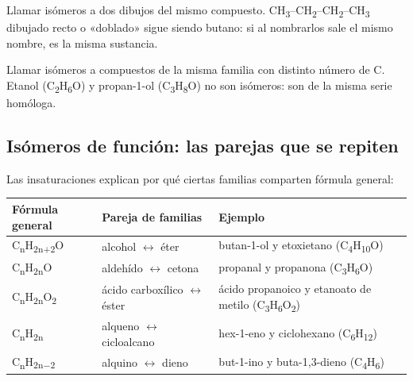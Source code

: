 \begin{ojo} Llamar isómeros a dos dibujos del mismo compuesto. CH\textsubscript{3}--CH\textsubscript{2}--CH\textsubscript{2}--CH\textsubscript{3} dibujado recto o «doblado» sigue siendo butano: si al nombrarlos sale el mismo nombre, es la misma sustancia.\end{ojo}
 
\begin{ojo} Llamar isómeros a compuestos de la misma familia con distinto número de C. Etanol (C\textsubscript{2}H\textsubscript{6}O) y propan-1-ol (C\textsubscript{3}H\textsubscript{8}O) no son isómeros: son de la misma serie homóloga.\end{ojo}
\subsection{Isómeros de función: las parejas que se repiten}
Las insaturaciones explican por qué ciertas familias comparten fórmula general:

 
\begin{center}\small
\begin{tabularx}{\linewidth}{@{}>{\raggedright\arraybackslash\hsize=0.56\hsize}X>{\raggedright\arraybackslash\hsize=0.94\hsize}X>{\raggedright\arraybackslash\hsize=1.50\hsize}X@{}}
\toprule
\textbf{Fórmula general} & \textbf{Pareja de familias} & \textbf{Ejemplo} \\
\midrule
C\textsubscript{n}H\textsubscript{2n+2}O & alcohol \ensuremath{\leftrightarrow} éter & butan-1-ol y etoxietano (C\textsubscript{4}H\textsubscript{10}O) \\
C\textsubscript{n}H\textsubscript{2n}O & aldehído \ensuremath{\leftrightarrow} cetona & propanal y propanona (C\textsubscript{3}H\textsubscript{6}O) \\
C\textsubscript{n}H\textsubscript{2n}O\textsubscript{2} & ácido carboxílico \ensuremath{\leftrightarrow} éster & ácido propanoico y etanoato de metilo (C\textsubscript{3}H\textsubscript{6}O\textsubscript{2}) \\
C\textsubscript{n}H\textsubscript{2n} & alqueno \ensuremath{\leftrightarrow} cicloalcano & hex-1-eno y ciclohexano (C\textsubscript{6}H\textsubscript{12}) \\
C\textsubscript{n}H\textsubscript{2n\ensuremath{-}2} & alquino \ensuremath{\leftrightarrow} dieno & but-1-ino y buta-1,3-dieno (C\textsubscript{4}H\textsubscript{6}) \\
\bottomrule
\end{tabularx}
\end{center}
  

